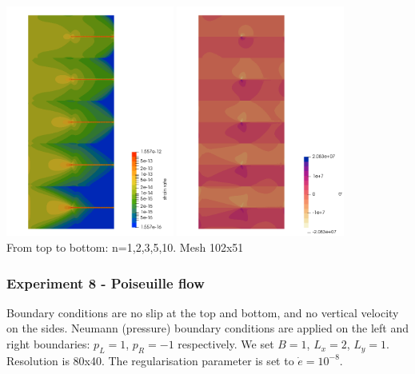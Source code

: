 \begin{center}
\includegraphics[width=5.52cm]{python_codes/fieldstone_87/results/experiment_07/sr}
\includegraphics[width=5.52cm]{python_codes/fieldstone_87/results/experiment_07/press}\\
{\captionfont From top to bottom: n=1,2,3,5,10. Mesh 102x51}
\end{center}





\newpage
\subsubsection*{Experiment 8 - Poiseuille flow}

Boundary conditions are no slip at the top and bottom, and no vertical 
velocity on the sides.
Neumann (pressure) boundary conditions are applied on the 
left and right boundaries: $p_L=1$, $p_R=-1$ respectively.
We set $B=1$, $L_x=2$, $L_y=1$. 
Resolution is 80x40. The regularisation parameter is set to $\dot{e}=10^{-8}$.

